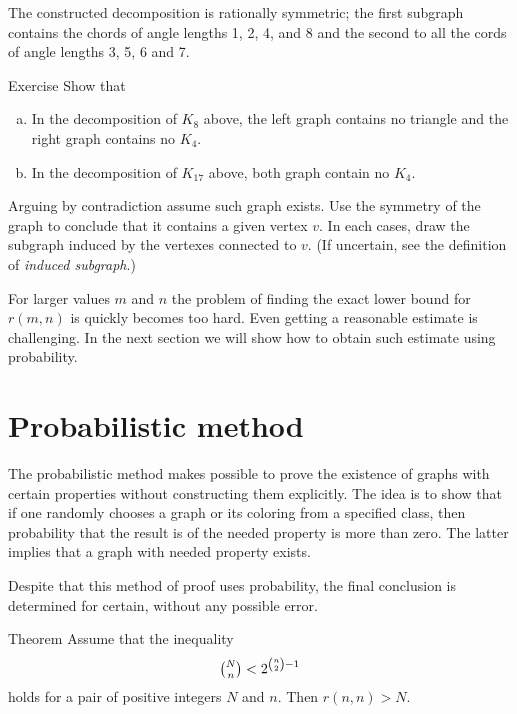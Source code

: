 The constructed decomposition is rationally symmetric; the first subgraph contains the chords of angle lengths 1, 2, 4, and 8 and the second to all the cords of angle lengths 3, 5, 6 and 7.

\begin{thm}{Exercise}
Show that 

\begin{enumerate}[(a)]
\item In the decomposition of $K_8$ above, the left graph contains no triangle and the right graph contains no $K_4$.
\item In the decomposition of $K_{17}$ above, both graph contain no $K_4$.
\end{enumerate}
\end{thm}

Arguing by contradiction assume such graph exists.
Use the symmetry of the graph to conclude that it contains a given vertex $v$.
In each cases, draw the subgraph induced by the vertexes connected to $v$.
(If uncertain, see the definition of {}\emph{induced subgraph}.)


\medskip

For larger values $m$ and $n$ the problem of finding the exact lower bound for $r(m,n)$ is quickly becomes too hard.
Even getting a reasonable estimate is challenging.
In the next section we will show how to obtain such estimate using probability.

\section*{Probabilistic method}

The probabilistic method makes possible to prove the existence of graphs with certain properties without constructing them explicitly.
The idea is to show that if one randomly chooses a graph or its coloring from a specified class, then probability that the result is of the needed property is more than zero.
The latter implies that a graph with needed property exists.

Despite that this method of proof uses probability, the final conclusion is determined for certain, without any possible error.


\medskip

\begin{thm}{Theorem}\label{thm:ramsey-lower}
Assume that the inequality 
\[\tbinom N n < 2^{{\binom n 2} - 1}\]
holds for a pair of positive integers $N$ and $n$.
Then $r(n,n)>N$.
\end{thm}

